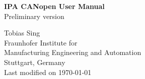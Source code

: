 \begin{titlepage}
\vspace*{13mm}
\begin{center}
  \vspace{10mm} 
         {\Large \bf IPA CANopen User Manual\\}
  \vspace{3mm}
         {  Preliminary version\\}
              

  \vspace{80mm}
  \vspace{10mm}
         {\large Tobias Sing} \\
  \vspace{5mm}
         {\large Fraunhofer Institute for}\\
         {\large Manufacturing Engineering and Automation} \\
         \vspace{5mm}
         {\large Stuttgart, Germany} \\
  \vfill
         {\large Last modified on \today}
\end{center}
\end{titlepage}

\clearpage
\thispagestyle{empty}
\cleardoublepage
